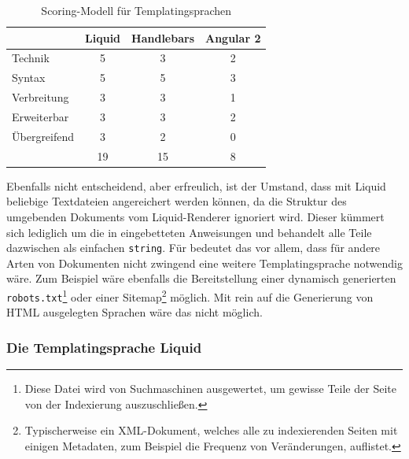 \begin{table}[h]
  \centering 
  \begin{tabular}{ l c c c }
                 & Liquid                 & Handlebars                & Angular 2                       \\
    \hline
    Technik      & 5                      & 3                         & 2                               \\
    Syntax       & 5                      & 5                         & 3                               \\
    Verbreitung  & 3                      & 3                         & 1                               \\
    Erweiterbar  & 3                      & 3                         & 2                               \\
    Übergreifend & 3                      & 2                         & 0                               \\
    \hline \hline
                 & 19                     & 15                        & 8
  \end{tabular}
  \caption{Scoring-Modell für Templatingsprachen}
  \label{tab:scoring-templating-language}
\end{table}

Ebenfalls nicht entscheidend, aber erfreulich, ist der Umstand, dass mit Liquid beliebige Textdateien angereichert werden können, da die Struktur des umgebenden Dokuments vom Liquid-Renderer ignoriert wird. Dieser kümmert sich lediglich um die in eingebetteten Anweisungen und behandelt alle Teile dazwischen als einfachen \texttt{string}. Für \idename bedeutet das vor allem, dass für andere Arten von Dokumenten nicht zwingend eine weitere Templatingsprache notwendig wäre. Zum Beispiel wäre ebenfalls die Bereitstellung einer dynamisch generierten \texttt{robots.txt}\footnote{Diese Datei wird von Suchmaschinen ausgewertet, um gewisse Teile der Seite von der Indexierung auszuschließen.} oder einer Sitemap\footnote{Typischerweise ein XML-Dokument, welches alle zu indexierenden Seiten mit einigen Metadaten, zum Beispiel die Frequenz von Veränderungen, auflistet.} möglich. Mit rein auf die Generierung von HTML ausgelegten Sprachen wäre das nicht möglich.

\subsubsection{Die Templatingsprache Liquid}

